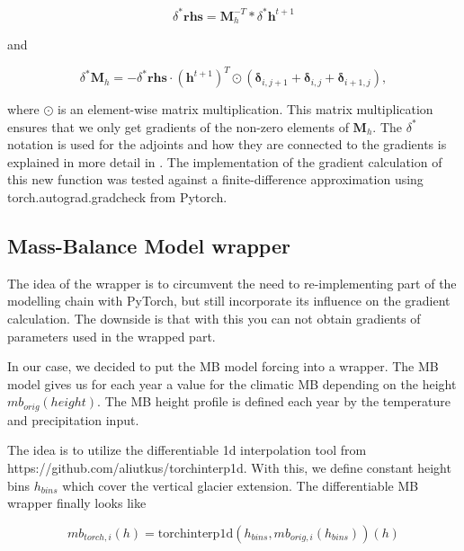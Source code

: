 \documentclass[journal abbreviation, manuscript]{copernicus}
\begin{document}
\begin{equation}
    \delta^*\boldsymbol{rhs} = \boldsymbol{M}_h^{-T} * \delta^* \boldsymbol{h}^{t+1}
\end{equation}

\noindent and

\begin{equation}
    \delta^*\boldsymbol{M}_h = - \delta^* \boldsymbol{rhs} \cdot (\boldsymbol{h}^{t+1})^T \odot (\boldsymbol{\delta}_{i, j + 1} + \boldsymbol{\delta}_{i, j} + \boldsymbol{\delta}_{i + 1, j}),
\end{equation}

\noindent where $\odot$ is an element-wise matrix multiplication. This matrix multiplication ensures that we only get gradients of the non-zero elements of $\boldsymbol{M}_h$. The $\delta^*$ notation is used for the adjoints and how they are connected to the gradients is explained in more detail in \cite{Goldberg2013}. The implementation of the gradient calculation of this new function was tested against a finite-difference approximation using \textsf{torch.autograd.gradcheck} from Pytorch.

\subsection{Mass-Balance Model wrapper}     %
\label{appendix:mb_model_wrapper}

The idea of the wrapper is to circumvent the need to re-implementing part of the modelling chain with PyTorch, but still incorporate its influence on the gradient calculation. The downside is that with this you can not obtain gradients of parameters used in the wrapped part.

In our case, we decided to put the MB model forcing into a wrapper. The MB model gives us for each year a value for the climatic MB depending on the height $mb_{orig}(height)$. The MB height profile is defined each year by the temperature and precipitation input.

The idea is to utilize the differentiable 1d interpolation tool from https://github.com/aliutkus/torchinterp1d. With this, we define constant height bins $h_{bins}$ which cover the vertical glacier extension. The differentiable MB wrapper finally looks like

\begin{equation}
    mb_{torch, i}(h) = \mathrm{torchinterp1d}(h_{bins}, mb_{orig, i}(h_{bins}))(h)
\end{equation}
\end{document}
